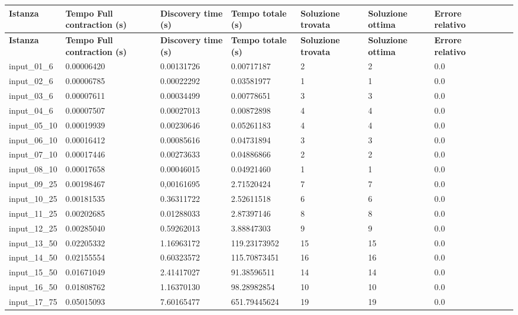 \scriptsize
\begin{tabularx}{\textwidth}{*{10}{Y}}
    \toprule
    \textbf{Istanza} & \textbf{Tempo Full contraction (s)} & \textbf{Discovery time (s)} & \textbf{Tempo totale (s)} & \textbf{Soluzione trovata} & \textbf{Soluzione ottima} & \textbf{Errore relativo}\\
    \endfirsthead
    \toprule
    \textbf{Istanza} & \textbf{Tempo Full contraction (s)} & \textbf{Discovery time (s)} & \textbf{Tempo totale (s)} & \textbf{Soluzione trovata} & \textbf{Soluzione ottima} & \textbf{Errore relativo}\\
    \endhead
    \midrule
    input\_01\_6	&	0.00006420	&	0.00131726	&	0.00717187	&	2	&	2	&	0.0	\\\midrule
	input\_02\_6	&	0.00006785	&	0.00022292	&	0.03581977	&	1	&	1	&	0.0	\\\midrule
	input\_03\_6	&	0.00007611	&	0.00034499	&	0.00778651	&	3	&	3	&	0.0	\\\midrule
	input\_04\_6	&	0.00007507	&	0.00027013	&	0.00872898	&	4	&	4	&	0.0	\\\midrule
	input\_05\_10	&	0.00019939	&	0.00230646	&	0.05261183	&	4	&	4	&	0.0	\\\midrule
	input\_06\_10	&	0.00016412	&	0.00085616	&	0.04731894	&	3	&	3	&	0.0	\\\midrule
	input\_07\_10	&	0.00017446	&	0.00273633	&	0.04886866	&	2	&	2	&	0.0	\\\midrule
	input\_08\_10	&	0.00017658	&	0.00046015	&	0.04921460	&	1	&	1	&	0.0	\\\midrule
	input\_09\_25	&	0.00198467	&	0,00161695	&	2.71520424	&	7	&	7	&	0.0	\\\midrule
	input\_10\_25	&	0.00181535	&	0.36311722	&	2.52611518	&	6	&	6	&	0.0	\\\midrule
	input\_11\_25	&	0.00202685	&	0.01288033	&	2.87397146	&	8	&	8	&	0.0	\\\midrule
	input\_12\_25	&	0.00285040	&	0.59262013	&	3.88847303	&	9	&	9	&	0.0	\\\midrule
	input\_13\_50	&	0.02205332	&	1.16963172	&	119.23173952	&	15	&	15	 & 0.0	\\\midrule
	input\_14\_50	&	0.02155554	&	0.60323572	&	115.70873451	&	16	&	16	 & 0.0	\\\midrule
	input\_15\_50	&	0.01671049	&	2.41417027	&	91.38596511		&	14	&	14	 & 0.0	\\\midrule
	input\_16\_50	&	0.01808762	&	1.16370130	&	98.28982854		&	10	&	10	 & 0.0	\\\midrule
	input\_17\_75	&	0.05015093	&	7.60165477	&	651.79445624	&	19	&	19	 & 0.0	\\\midrule

\end{tabularx}
